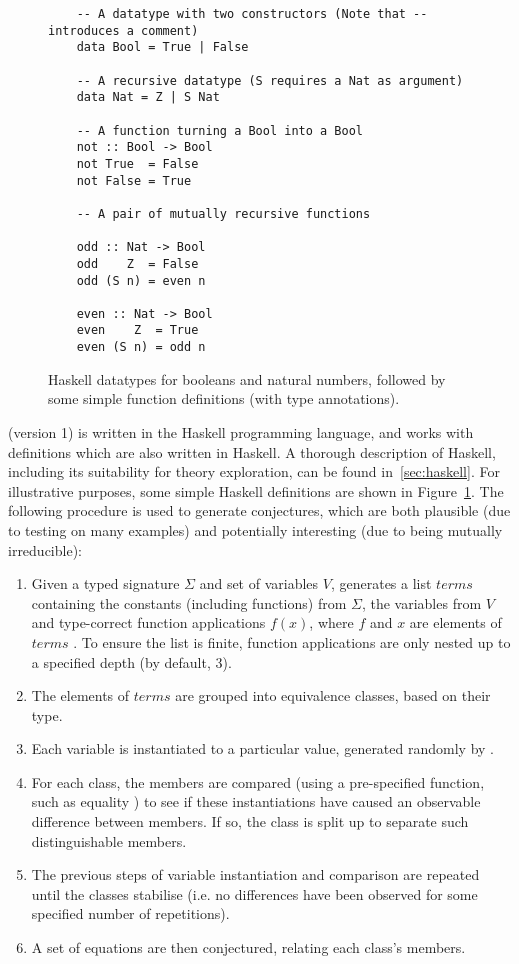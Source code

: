 \begin{figure}
  \centering
  \begin{verbatim}
    -- A datatype with two constructors (Note that -- introduces a comment)
    data Bool = True | False

    -- A recursive datatype (S requires a Nat as argument)
    data Nat = Z | S Nat

    -- A function turning a Bool into a Bool
    not :: Bool -> Bool
    not True  = False
    not False = True

    -- A pair of mutually recursive functions

    odd :: Nat -> Bool
    odd    Z  = False
    odd (S n) = even n

    even :: Nat -> Bool
    even    Z  = True
    even (S n) = odd n
  \end{verbatim}
  \caption{Haskell datatypes for booleans and natural numbers, followed by some
    simple function definitions (with type annotations).}
  \label{fig:haskellteexample}
\end{figure}

\qspec{} (version 1) is written in the Haskell programming language, and works
with definitions which are also written in Haskell. A thorough description of
Haskell, including its suitability for theory exploration, can be found
in~\ref{sec:haskell}. For illustrative purposes, some simple Haskell definitions
are shown in Figure~\ref{fig:haskellteexample}. The following procedure is used to
generate conjectures, which are both plausible (due to testing on many examples)
and potentially interesting (due to being mutually irreducible):

\begin{enumerate}
\item Given a typed signature $\Sigma$ and set of variables $V$, \qspec{}
  generates a list $terms$ containing the constants (including functions) from
  $\Sigma$, the variables from $V$ and type-correct function applications
  $f(x)$, where $f$ and $x$ are elements of $terms$ \iffalse TODO: A little
  awkward; maybe use the above notation? \fi. To ensure the list is finite,
  function applications are only nested up to a specified depth (by default, 3).
\item The elements of $terms$ are grouped into equivalence classes, based on
  their type.
\item Each variable is instantiated to a particular value, generated randomly by
  \qcheck{}.
\item For each class, the members are compared (using a pre-specified function,
  such as equality \hs{==}) to see if these instantiations have caused an
  observable difference between members. If so, the class is split up to
  separate such distinguishable members.
\item The previous steps of variable instantiation and comparison are repeated
  until the classes stabilise (i.e. no differences have been observed for some
  specified number of repetitions).
\item A set of equations are then conjectured, relating each class's members.
\end{enumerate}

